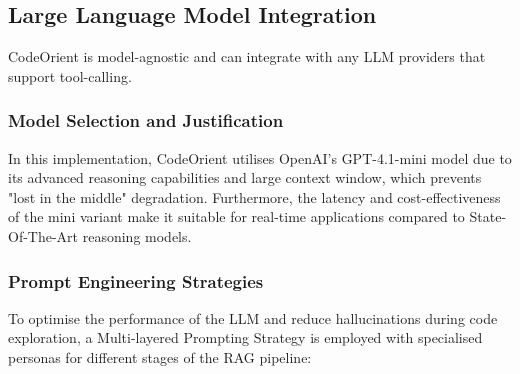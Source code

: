 \subsection{Large Language Model Integration}
CodeOrient is model-agnostic and can integrate with any LLM providers that support tool-calling. 
\subsubsection{Model Selection and Justification}
In this implementation, CodeOrient utilises OpenAI's GPT-4.1-mini model due to its advanced reasoning capabilities and large context window, which prevents "lost in the middle" degradation. Furthermore, the latency and cost-effectiveness of the mini variant make it suitable for real-time applications compared to State-Of-The-Art reasoning models.
\subsubsection{Prompt Engineering Strategies}
To optimise the performance of the LLM and reduce hallucinations during code exploration, a Multi-layered Prompting Strategy is employed with specialised personas for different stages of the RAG pipeline:
